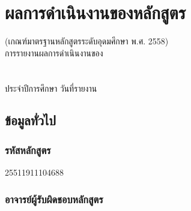 \chapter{ผลการดำเนินงานของหลักสูตร}

\begin{center}
(เกณฑ์มาตรฐานหลักสูตรระดับอุดมศึกษา พ.ศ. 2558)\\[1cm]
การรายงานผลการดำเนินงานของ\\ \printprogram{} \\
\printfaculty{}  \printuniversity{}\\
ประจำปีการศึกษา \printyear{} วันที่รายงาน \printrepdate{}
\end{center}

\section{ข้อมูลทั่วไป}

\subsection*{รหัสหลักสูตร}
25511911104688

\subsection*{อาจารย์ผู้รับผิดชอบหลักสูตร}

